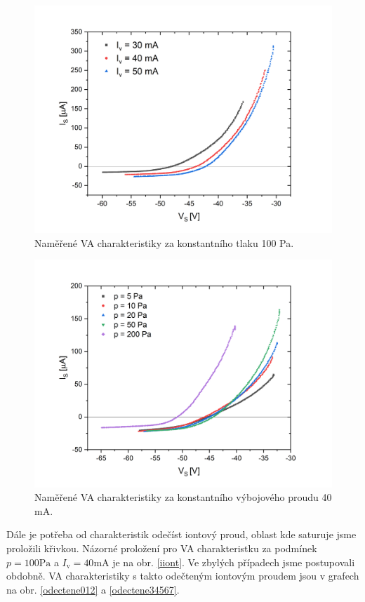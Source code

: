 \documentclass[a4paper,12pt]{article}
\begin{document}
\begin{figure}[h]
	\centering
	\includegraphics[width=145mm]{namerene012.png}
	\caption{Naměřené VA charakteristiky za konstantního tlaku 100 \si{\pascal}.}
	\label{namerene012}
\end{figure}

\begin{figure}[h]
	\centering
	\includegraphics[width=145mm]{namerene34567.png}
	\caption{Naměřené VA charakteristiky za konstantního výbojového proudu 40 \si{\milli\ampere}.}
	\label{namerene34567}
\end{figure}

Dále je potřeba od charakteristik odečíst iontový proud, oblast kde saturuje jsme proložili křivkou. Názorné proložení pro VA charakteristku za podmínek $p = 100 \si{\pascal}$ a $I_\text{v} = 40 \si{\milli\ampere}$ je na obr. \ref{iiont}. Ve zbylých případech jsme postupovali obdobně. VA charakteristiky s takto odečteným iontovým proudem jsou v grafech na obr. \ref{odectene012} a \ref{odectene34567}.
\end{document}
